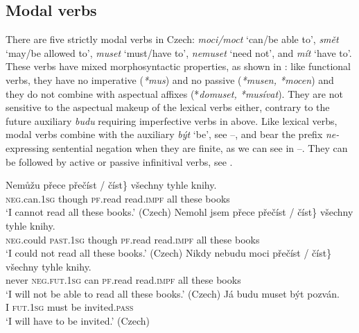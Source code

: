 \documentclass[output=paper,colorlinks,citecolor=brown,
modfonts
]{langscibook}
\begin{document}
\subsection{Modal verbs} \label{sec:3.2} 
There are five strictly modal verbs in Czech: \textit{moci/moct} `can/be able to', \textit{smět} `may/be allowed to', \textit{muset} `must/have to', \textit{nemuset} `need not', and \textit{mít} `have to'. These verbs have mixed morphosyntactic properties, as shown in \cite{Kyncl2008}: like functional verbs, they have no imperative (\textit{*mus}) and no passive (\textit{*musen, *mocen}) and they do not combine with aspectual affixes (*\textit{domuset, *musívat}). They are not sensitive to the aspectual makeup of the lexical verbs either, contrary to the future auxiliary \textit{budu} requiring imperfective verbs in  above. Like lexical verbs, modal verbs combine with the auxiliary \textit{být} `be', see --, and bear the prefix \textit{ne-} expressing sentential negation when they are finite, as we can see in --. They can be followed by active or passive infinitival verbs, see .

\begin{exe}
\ex \label{14}
\begin{xlist}
\ex \label{14a}\gll Nemůžu přece \minsp{\{} přečíst  / číst\} všechny tyhle knihy. \\
\textsc{neg}.can.\textsc{1sg} though {} \textsc{pf}.read {}  read.\textsc{impf} all these books \\
\glt `I cannot read all these books.'  \hfill (Czech)
\ex \label{14b}\gll Nemohl jsem přece \minsp{\{} přečíst / číst\} všechny tyhle knihy.\\
\textsc{neg}.could  \textsc{past}.\textsc{1sg} though {} \textsc{pf}.read {}  read.\textsc{impf} all  these books\\
\glt `I could not read all these books.'  \hfill (Czech)
\ex \label{14c}\gll Nikdy  nebudu moci  \minsp{\{} přečíst  / číst\} všechny tyhle  knihy. \\
never \textsc{neg}.\textsc{fut}.\textsc{1sg} can {} \textsc{pf}.read {} read.\textsc{impf} all these books \\
\glt `I will not be able to read all these books.'   \hfill (Czech)
\ex \label{14d} \gll Já budu muset být pozván.\\
I   \textsc{fut}.\textsc{1sg}  must  be   invited.\textsc{pass} \\
\glt  `I will have to be invited.'   \hfill (Czech)
\end{xlist}
\end{exe}
\end{document}
